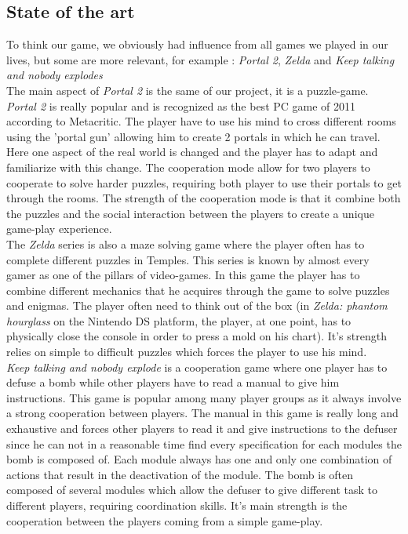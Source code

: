 \documentclass[12pt]{article}
\begin{document}
         
    \subsection{State of the art}
    To think our game, we obviously had influence from all games we played in our lives, but some are more relevant, for example : \textit{Portal 2}, \textit{Zelda} and \textit{Keep talking and nobody explodes}\\
    
    
    The main aspect of \textit{Portal 2} is the same of our project, it is a puzzle-game. \textit{Portal 2} is really popular and is recognized as the best PC game of 2011 according to Metacritic. The player have to use his mind to cross different rooms using the 'portal gun' allowing him to create 2 portals in which he can travel. Here one aspect of the real world is changed and the player has to adapt and familiarize with this change. The cooperation mode allow for two players to cooperate to solve harder puzzles, requiring both player to use their portals to get through the rooms. The strength of the cooperation mode is that it combine both the puzzles and the social interaction between the players to create a unique game-play experience.\\

The \textit{Zelda} series is also a maze solving game where the player often has to complete different puzzles in Temples. This series is known by almost every gamer as one of the pillars of video-games. In this game the player has to combine different mechanics that he acquires through the game to solve puzzles and enigmas.
The player often need to think out of the box (in \textit{Zelda: phantom hourglass} on the Nintendo DS platform, the player, at one point, has to physically close the console in order to press a mold on his chart). It's strength relies on simple to difficult puzzles which forces the player to use his mind.\\

\textit{Keep talking and nobody explode} is a cooperation game where one player has to defuse a bomb while other players have to read a manual to give him instructions. This game is popular among many player groups as it always involve a strong cooperation between players. The manual in this game is really long and exhaustive and forces other players to read it and give instructions to the defuser since he can not in a reasonable time find every specification for each modules the bomb is composed of. Each module always has one and only one combination of actions that result in the deactivation of the module. The bomb is often composed of several modules which allow the defuser to give different task to different players, requiring coordination skills. It's main strength is the cooperation between the players coming from a simple game-play.\\
\end{document}
